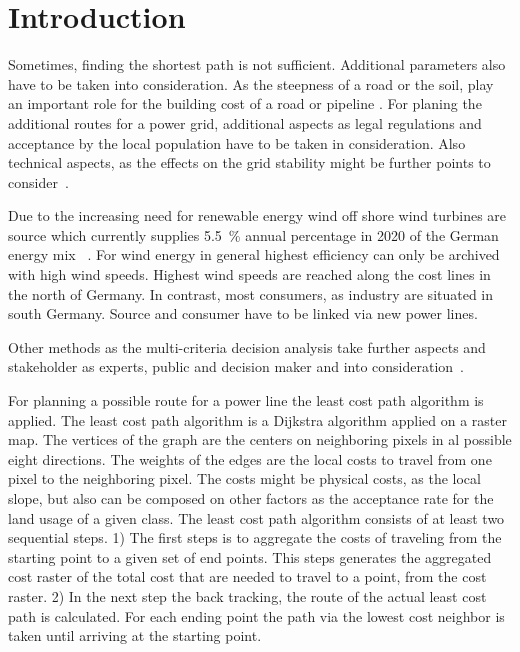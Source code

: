 \documentclass[acmtog]{acmart}
\begin{document}
	\section{Introduction}\label{sec:introduction}

	Sometimes, finding the shortest path is not sufficient.
	Additional parameters also have to be taken into consideration.
	As the steepness of a road or the soil, play an important role for the building cost of a road or pipeline
	\cite{suleiman_optimal_2015}.
	For planing the additional routes for a power grid, additional aspects as legal regulations and acceptance
	by the local population have to be taken in consideration.
	Also technical aspects, as the effects on the grid stability might be further points to consider~\cite{schafer_understanding_2022}.
	
	Due to the increasing need for renewable energy wind off shore wind turbines are source which currently supplies 5.5~\% annual percentage in 2020 of the German energy mix~\cite{noauthor_nettostromerzeugung_2021}
.	For wind energy in general highest efficiency can only be archived with high wind speeds.
	Highest wind speeds are reached along the cost lines in the north of Germany.
	In contrast, most consumers, as industry are situated in south Germany.
	Source and consumer have to be linked via new power lines.

	Other methods as the multi-criteria decision analysis take further aspects and stakeholder as experts, public and decision maker and into consideration~\cite{bertsch_participatory_2016}.
	
	For planning a possible route for a power line the least cost path algorithm is applied.
	The least cost path algorithm is a Dijkstra algorithm applied on a raster map.
	The vertices of the graph are the centers on neighboring pixels in al possible eight directions.
	The weights of the edges are the local costs to travel from one pixel to the neighboring pixel.
	The costs might be physical costs, as the local slope, but also can be composed on other factors as the acceptance rate for the land usage of a given class.
	The least cost path algorithm consists of at least two sequential steps.
	1) The first steps is to aggregate the costs of traveling from the starting point to a given set of end points.
	This steps generates the aggregated cost raster of the total cost that are needed to travel to a point, from the cost raster.
	2) In the next step the back tracking, the route of the actual least cost path is calculated.
	For each ending point the path via the lowest cost neighbor is taken until arriving at the starting point.
	
\end{document}
